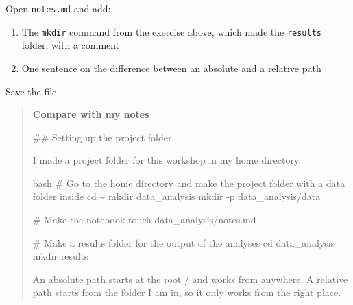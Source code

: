 \documentclass[
  letterpaper,
  DIV=11,
  numbers=noendperiod]{scrreprt}
\newenvironment{Shaded}{}{}
\newcommand{\AttributeTok}[1]{\textcolor[rgb]{0.84,0.23,0.29}{#1}}
\newcommand{\BuiltInTok}[1]{\textcolor[rgb]{0.84,0.23,0.29}{#1}}
\newcommand{\CommentTok}[1]{\textcolor[rgb]{0.42,0.45,0.49}{#1}}
\newcommand{\FunctionTok}[1]{\textcolor[rgb]{0.44,0.26,0.76}{#1}}
\newcommand{\InformationTok}[1]{\textcolor[rgb]{0.42,0.45,0.49}{#1}}
\newcommand{\NormalTok}[1]{\textcolor[rgb]{0.14,0.16,0.18}{#1}}
\providecommand{\tightlist}{%
  \setlength{\itemsep}{0pt}\setlength{\parskip}{0pt}}
\begin{document}
\begin{tcolorbox}[enhanced jigsaw, coltitle=black, breakable, titlerule=0mm, colback=white, rightrule=.15mm, bottomrule=.15mm, toprule=.15mm, colframe=quarto-callout-color-frame, colbacktitle=quarto-callout-color!10!white, bottomtitle=1mm, opacitybacktitle=0.6, toptitle=1mm, leftrule=.75mm, arc=.35mm, title=\textcolor{quarto-callout-color}{\faInfo}\hspace{0.5em}{Notebook checkpoint: Finding your way}, left=2mm, opacityback=0]

Open \texttt{notes.md} and add:

\begin{enumerate}
\def\labelenumi{\arabic{enumi}.}
\tightlist
\item
  The \texttt{mkdir} command from the exercise above, which made the
  \texttt{results} folder, with a comment
\item
  One sentence on the difference between an absolute and a relative path
\end{enumerate}

Save the file.

\begin{quote}
\textbf{Compare with my notes}

\begin{Shaded}
\begin{Highlighting}[]
\FunctionTok{\#\# Setting up the project folder}

\NormalTok{I made a project folder for this workshop in my home directory.}

\InformationTok{\textasciigrave{}\textasciigrave{}\textasciigrave{}bash}
\CommentTok{\# Go to the home directory and make the project folder with a data folder inside}
\BuiltInTok{cd}\NormalTok{ \textasciitilde{}}
\FunctionTok{mkdir}\NormalTok{ data\_analysis}
\FunctionTok{mkdir} \AttributeTok{{-}p}\NormalTok{ data\_analysis/data}

\CommentTok{\# Make the notebook}
\FunctionTok{touch}\NormalTok{ data\_analysis/notes.md}

\CommentTok{\# Make a results folder for the output of the analyses}
\BuiltInTok{cd}\NormalTok{ data\_analysis}
\FunctionTok{mkdir}\NormalTok{ results}
\InformationTok{\textasciigrave{}\textasciigrave{}\textasciigrave{}}

\NormalTok{An absolute path starts at the root }\InformationTok{\textasciigrave{}/\textasciigrave{}}\NormalTok{ and works from anywhere.}
\NormalTok{A relative path starts from the folder I am in, so it only works from the right place.}
\end{Highlighting}
\end{Shaded}
\end{quote}

\end{tcolorbox}
\end{document}
